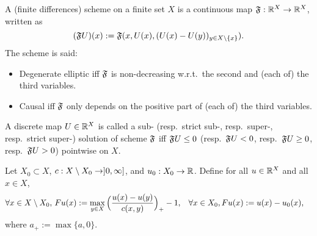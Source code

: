 \begin{definition}
	\label{def:MonotoneScheme}
	A (finite differences) scheme on a finite set $X$ is a continuous map $\mathfrak{F} : \mathbb{R}^X \to \mathbb{R}^X$, written as
	\begin{equation*}
		(\mathfrak{F} U)(x) := \mathfrak{F}(x, U(x), (U(x)-U(y))_{y \in X \setminus \{x\}}).
	\end{equation*}	
	The scheme is said:
	\begin{itemize}
		\item Degenerate elliptic iff $\mathfrak{F}$ is non-decreasing w.r.t.\ the second and (each of) the third variables.
		\item Causal iff $\mathfrak{F}$ only depends on the positive part of (each of) the third variables.
	\end{itemize}
	A discrete map $U \in \mathbb{R}^X$ is called a sub- (resp.\ strict sub-, resp.\ super-, resp.\ strict super-) solution of scheme $\mathfrak{F}$  iff $\mathfrak{F} U \leq 0$ (resp.\ $\mathfrak{F} U<0$, resp.\ $\mathfrak{F} U\geq 0$, resp.\ $\mathfrak{F} U > 0$) pointwise on $X$.
\end{definition}

\begin{definition}
\label{def:graph_scheme}
Let $X_0 \subset X$, $c : X\setminus X_0 \to ]0,\infty]$, and $u_0 : X_0 \to \mathbb{R}$. Define for all $u \in \mathbb{R}^X$ and all $x \in X$,
	\begin{align*}
		\forall x &\in X\setminus X_0,\, Fu(x) := \max_{y \in X}\Big( \frac{u(x)-u(y)}{c(x,y)} \Big)_+- 1,&
		\forall x &\in X_0, F u(x) := u(x)-u_0(x),
	\end{align*}
	where $a_+ := \max \{a,0\}$. 
\end{definition}

